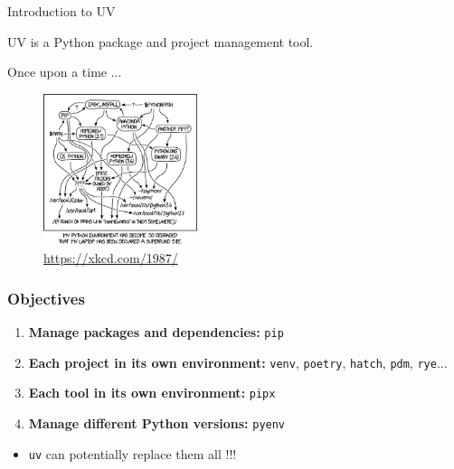 \documentclass[aspectratio=169,xcolor=dvipsnames,svgnames,x11names,fleqn]{beamer}
\begin{document}
\begin{frame}{Introduction to UV}

    \centering
    \huge
    UV is a Python package and project management tool.
    
\end{frame}

\begin{frame}{}

    Once upon a time ... 

    \begin{figure}
        \centering
        \includegraphics[width=0.4\textwidth]{figures/xkcd.png}
        \caption{\url{https://xkcd.com/1987/}}
    \end{figure}
    
\end{frame}

\begin{frame}
    \frametitle{Objectives}
    \begin{enumerate}
        \item \textbf{Manage packages and dependencies:} \texttt{pip}
        \item \textbf{Each project in its own environment:} \texttt{venv}, \texttt{poetry}, \texttt{hatch}, \texttt{pdm}, \texttt{rye}...
        \item \textbf{Each tool in its own environment:} \texttt{pipx}
        \item \textbf{Manage different Python versions:} \texttt{pyenv}
    \end{enumerate}

    \begin{tblock}{}
        \begin{itemize}
        \item \texttt{uv} can potentially replace them all !!!
    \end{itemize}
    \end{tblock}

\end{frame}
\end{document}
